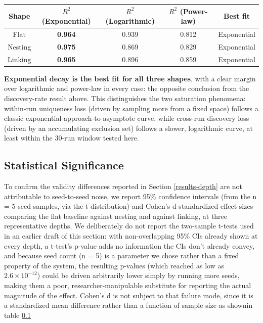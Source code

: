 \documentclass[]{article}
\begin{document}
        \begin{table}[]
            \centering
            \begin{tabularx}{\linewidth}{C C C C C}
                \hline
                Shape & $R^2$ (Exponential) & $R^2$ (Logarithmic) & $R^2$ (Power-law) & Best fit \\
                \hline
                Flat & \textbf{0.964} & 0.939 & 0.812 & Exponential \\
                Nesting & \textbf{0.975} & 0.869 & 0.829 & Exponential \\
                Linking & \textbf{0.965} & 0.896 & 0.859 & Exponential \\
                \hline
            \end{tabularx}
            \label{tab:uniqueness-to-amount}
        \end{table}
        
        \textbf{Exponential decay is the best fit for all three shapes}, with a clear margin over logarithmic and power-law in every case: the opposite conclusion from the discovery-rate result above. This distinguishes the two saturation phenomena: within-run uniqueness loss (driven by sampling more from a fixed space) follows a classic exponential-approach-to-asymptote curve, while cross-run discovery loss (driven by an accumulating exclusion set) follows a slower, logarithmic curve, at least within the 30-run window tested here.

        \subsection{Statistical Significance}\label{statistical-significance}

        To confirm the validity differences reported in Section \ref{results-depth} are not attributable to seed-to-seed noise, we report 95\% confidence intervals (from the n = 5 seed samples, via the t-distribution) and Cohen's d standardized effect sizes comparing the flat baseline against nesting and against linking, at three representative depths. We deliberately do not report the two-sample t-tests used in an earlier draft of this section: with non-overlapping 95\% CIs already shown at every depth, a t-test's p-value adds no information the CIs don't already convey, and because seed count (n = 5) is a parameter we chose rather than a fixed property of the system, the resulting p-values (which reached as low as $2.6\times10^{-12}$) could be driven arbitrarily lower simply by running more seeds, making them a poor, researcher-manipulable substitute for reporting the actual magnitude of the effect. Cohen's d is not subject to that failure mode, since it is a standardized mean difference rather than a function of sample size as shownin table \ref{statistical-significance}
\end{document}
